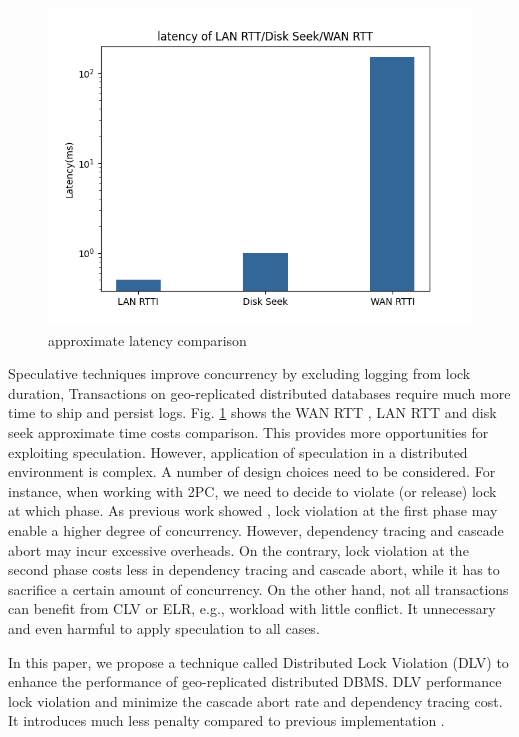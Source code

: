 \documentclass[conference]{IEEEtran}
\begin{document}
\begin{figure}[htbp]
  \centerline{\includegraphics[scale=0.4]{figure/log_write_latency.png}}
  \caption{approximate latency comparison\cite{Latency}}
  \label{fig:log_write_latency}
\end{figure}

Speculative techniques improve concurrency by excluding logging from lock duration,
Transactions on geo-replicated distributed databases require much more time to ship and persist logs.
Fig.    \ref{fig:log_write_latency} shows the WAN RTT , LAN RTT and disk seek approximate time costs comparison.
This provides more opportunities for exploiting speculation.
However, application of speculation in a distributed environment is complex.
A number of design choices need to be considered.
For instance, when working with 2PC, we need to decide to violate (or release) lock at which phase.
As previous work showed \cite{CLV:conf/sigmod/GraefeLKTV13}, lock violation at the first phase may enable a higher degree of concurrency.
However, dependency tracing and cascade abort may incur excessive overheads.
On the contrary, lock violation at the second phase costs less in dependency tracing and cascade abort, while it has to sacrifice a certain amount of concurrency.
On the other hand, not all transactions can benefit from CLV or ELR, e.g., workload with little conflict.
It unnecessary and even harmful to apply speculation to all cases.

In this paper, we propose a technique called Distributed Lock Violation (DLV) to enhance the performance of geo-replicated distributed DBMS.
DLV performance lock violation and minimize the cascade abort rate and dependency tracing cost.
It introduces much less penalty compared to previous implementation \cite{CLV:conf/sigmod/GraefeLKTV13}.
\end{document}
